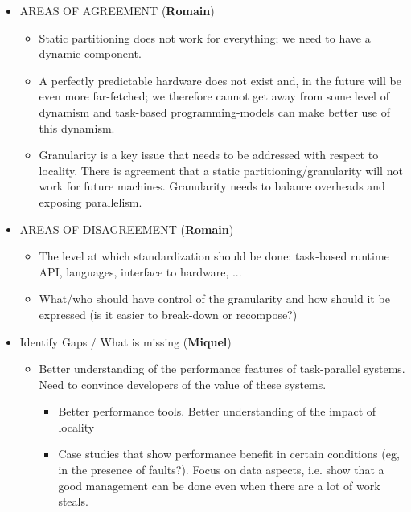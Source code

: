 \begin{itemize}
			
			
	\item AREAS OF AGREEMENT (\textbf{Romain})
		  \begin{itemize}
		  \item Static partitioning does not work for everything; we need to
		      have a dynamic component.
		  \item A perfectly predictable hardware does not exist and, in the
		      future will be even more far-fetched; we therefore cannot get
		      away from some level of dynamism and task-based
		      programming-models can make better use of this dynamism.
		  \item Granularity is a key issue that needs to be addressed with
		      respect to locality. There is agreement that a static
		      partitioning/granularity will not work for future
		      machines. Granularity needs to balance overheads and exposing
		      parallelism.
		  \end{itemize}
	
	
	
	\item AREAS OF DISAGREEMENT (\textbf{Romain})
		  \begin{itemize}
		  \item The level at which standardization should be done: task-based
		      runtime API, languages, interface to hardware, ...
		  \item What/who should have control of the granularity and how should
		      it be expressed (is it easier to break-down or recompose?)
		  \end{itemize}


	\item Identify Gaps / What is missing  (\textbf{Miquel})
	    \begin{itemize}
		
		\item Better understanding of the performance features of task-parallel
		systems. Need to convince developers of the value of these systems. 
		\begin{itemize}
		  \item Better performance tools. Better understanding of the impact of locality
		  \item Case studies that show performance benefit in certain conditions (eg,
		    in the presence of faults?). Focus on data aspects, i.e. show that
		a good management can be done even when there are a lot of work steals. 
	      \end{itemize}  
	  \end{itemize} 
	 


\end{itemize}
